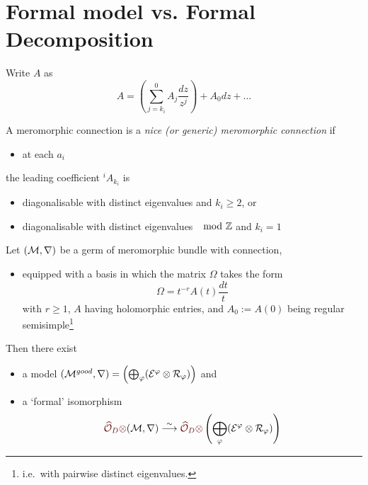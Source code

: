 \section{Formal model vs. Formal Decomposition}
\begin{paracol}{2}\sloppy
\switchcolumn[0]\noindent
  Write $A$ as
  \[
    A=\left(\sum^{0}_{j=k_i}A_j\frac{dz}{z^{j}}\right)+A_0dz+\dots
  \]
  \begin{defn}
    A meromorphic connection is a \emph{nice (or generic) meromorphic connection}
    if
    \begin{itemize}
      \item at each $a_i$
    \end{itemize}
    the leading coefficient ${}^iA_{k_i}$ is
    \begin{itemize}
      \item diagonalisable with distinct eigenvalues and $k_i\geq2$, or
      \item diagonalisable with distinct eigenvalues $\mod{\mathbb{Z}}$ and $k_i=1$
    \end{itemize}
  \end{defn}
\switchcolumn[1]\noindent
  \begin{thm}
    Let $(\mathcal{M},\nabla)$ be a germ of meromorphic bundle with connection,
    \begin{itemize}
      \item equipped with a basis in which the matrix $\Omega$ takes the form
        \[
          \Omega=t^{-r}A(t)\frac{dt}{t}
        \]
        with $r\geq1$, $A$ having holomorphic entries, and $A_0:=A(0)$
        being regular semisimple\footnote{i.e.\ with pairwise distinct
        eigenvalues.}
    \end{itemize}
    Then there exist
    \begin{itemize}
      \item a model $(\mathcal{M}^{good},\nabla)
        =\left(\bigoplus_\varphi(\mathcal{E}^\varphi\otimes\mathcal{R}_\varphi) \right)$ and
      \item a \textcolor{red!40!black}{`formal'} isomorphism
        \[
          \textcolor{red!40!black}{\hat\cO_{D}\otimes}(\cM,\nabla)
          \overset{\sim}{\longrightarrow}
        \textcolor{red!40!black}{\hat\cO_{D}\otimes}
          \left(\bigoplus_\phi(\cE^\phi\otimes\cR_\phi) \right)
        \]
    \end{itemize}
  \end{thm}
\end{paracol}

